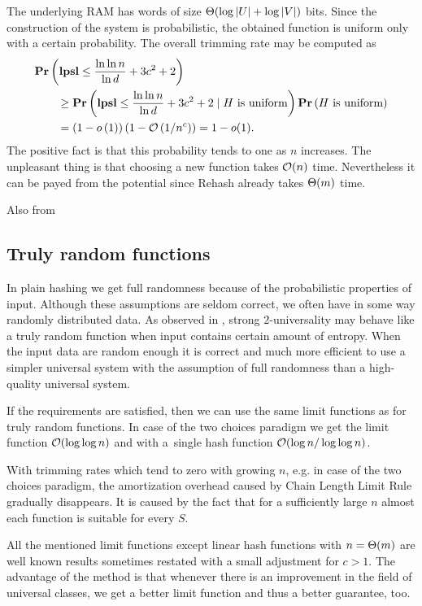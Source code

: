 The underlying RAM has words of size $\mathrm{\Theta}(\log |U| + \log |V|)$ bits. Since the construction of the system is probabilistic, the obtained function is uniform only with a certain probability. The overall trimming rate may be computed as
\[
\begin{split} 
& \mathbf{Pr}\left(\mathbf{lpsl} \leq \frac{\ln \ln n}{\ln d} + 3c^2 + 2\right) \\
	& \qquad \geq \mathbf{Pr}\left(\mathbf{lpsl} \leq \frac{\ln \ln n}{\ln d} + 3c^2 + 2 \mid H \mbox{ is uniform}\right) \mathbf{Pr}\left(H \mbox{ is uniform}\right) \\ 
	& \qquad = \left(1 - o\left(1\right)\right)\left(1 - \mathcal{O}\left({1}/{n^c}\right)\right) = 1 - o(1). \\
\end{split}
\]
The positive fact is that this probability tends to one as $n$ increases. The unpleasant thing is that choosing a new function takes $\mathcal{O}(n)$ time. Nevertheless it can be payed from the potential since Rehash already takes $\mathrm{\Theta}(m)$ time. 

Also from 

\subsection{Truly random functions}
\label{subsection-truly-random-functions}
In plain hashing we get full randomness because of the probabilistic properties of input. Although these assumptions are seldom correct, we often have in some way randomly distributed data. As observed in \cite{DBLP:conf/soda/MitzenmacherV08}, strong $2$-universality may behave like a truly random function when input contains certain amount of entropy. When the input data are random enough it is correct and much more efficient to use a simpler universal system with the assumption of full randomness than a high-quality universal system.

If the requirements are satisfied, then we can use the same limit functions as for truly random functions. In case of the two choices paradigm we get the limit function $\mathcal{O}(\log \log n)$ and with a~single hash function $\mathcal{O}(\log n / \log \log n)$. 

With trimming rates which tend to zero with growing $n$, e.g. in case of the two choices paradigm, the amortization overhead caused by Chain Length Limit Rule gradually disappears. 
It is caused by the fact that for a sufficiently large $n$ almost each function is suitable for every $S$.

All the mentioned limit functions except linear hash functions with $n = \mathrm{\Theta}(m)$ are well known results sometimes restated with a small adjustment for $c > 1$. 
The advantage of the method is that whenever there is an improvement in the field of universal classes, we get a better limit function and thus a better guarantee, too.
